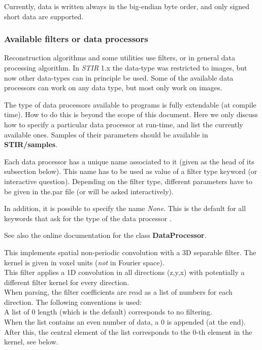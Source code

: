 \documentclass{article}
\newcommand{\tab}{\hspace{5mm}}
\begin{document}
Currently, data is written always in the big-endian byte order, 
and only signed short data are supported.



\subsubsection{
Available filters or data processors}
\label{sec:filters}
Reconstruction algorithms and some utilities use filters, or in 
general data processing algorithm. In \textit{STIR} 1.x the data-type was restricted
to images, but now other data-types can in principle be used. Some
of the available data processors can work on any data type, but most
only work on images.

The type of data processors 
available to programs is fully extendable (at compile time). 
How to do this is beyond the scope of this document. Here we 
only discuss how to specify a particular data processor at run-time, 
and list the currently available ones. Samples of their parameters 
should be available in \textbf{STIR/samples}.


Each data processor has a unique name associated to it (given 
as the head of its subsection below). This name has to be used 
as value of a filter type keyword (or interactive question). 
Depending on the filter type, different parameters have to be 
given in the.par file (or will be asked interactively).


In addition, it is possible to specify the name \textit{None}. This 
is the default for all keywords that ask for the type of 
the data processor .


See also the online documentation for the class \textbf{DataProcessor}.

{ 
}

This implements spatial non-periodic convolution with a 3D separable 
filter. The kernel is given in voxel units (\textit{not} in Fourier 
space).\\
This filter applies a 1D convolution in all directions (z,y,x) 
with potentially a different filter kernel for every direction.\\
When parsing, the filter coefficients are read as a list of numbers 
for each direction. The following conventions is used:\\
{\textbullet}\tab 
A list of 0 length (which is the default) corresponds to no filtering.\\
{\textbullet}\tab When the list contains an even number of data, a 0 is 
appended (at the end).\\
{\textbullet}\tab 
After this, the central element of the list corresponds to the 
0-th element in the kernel, see below.
\end{document}
